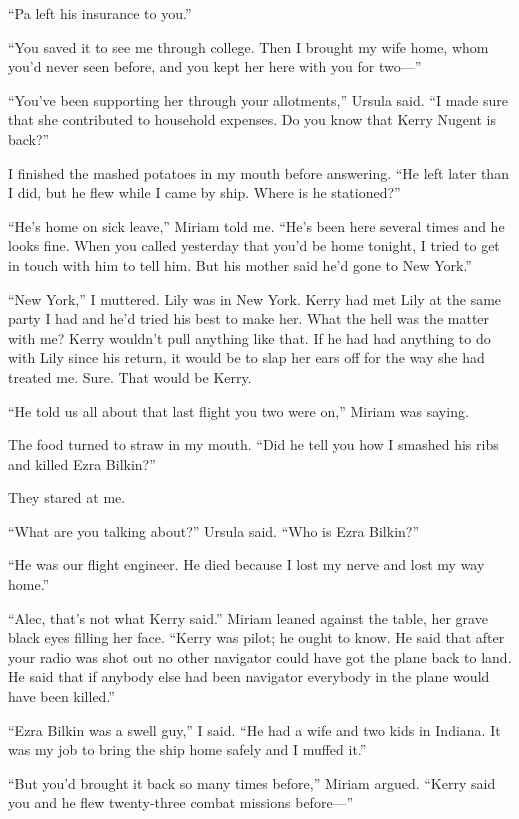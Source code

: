 \documentclass{novel}
\begin{document}
{“Pa left his insurance to you.”

“You saved it to see me through college. Then I brought my wife home, whom you’d never seen before, and you kept her here with you for two—”

“You’ve been supporting her through your allotments,” Ursula said. “I made sure that she contributed to household expenses. Do you know that Kerry Nugent is back?”

I finished the mashed potatoes in my mouth before answering. “He left later than I did, but he flew while I came by ship. Where is he stationed?”

“He’s home on sick leave,” Miriam told me. “He’s been here several times and he looks fine. When you called yesterday that you’d be home tonight, I tried to get in touch with him to tell him. But his mother said he’d gone to New York.”

“New York,” I muttered. Lily was in New York. Kerry had met Lily at the same party I had and he’d tried his best to make her. What the hell was the matter with me? Kerry wouldn’t pull anything like that. If he had had anything to do with Lily since his return, it would be to slap her ears off for the way she had treated me. Sure. That would be Kerry.

“He told us all about that last flight you two were on,” Miriam was saying.

The food turned to straw in my mouth. “Did he tell you how I smashed his ribs and killed Ezra Bilkin?”

They stared at me.

“What are you talking about?” Ursula said. “Who is Ezra Bilkin?”

“He was our flight engineer. He died because I lost my nerve and lost my way home.”

“Alec, that’s not what Kerry said.” Miriam leaned against the table, her grave black eyes filling her face. “Kerry was pilot; he ought to know. He said that after your radio was shot out no other navigator could have got the plane back to land. He said that if anybody else had been navigator everybody in the plane would have been killed.”

“Ezra Bilkin was a swell guy,” I said. “He had a wife and two kids in Indiana. It was my job to bring the ship home safely and I muffed it.”

“But you’d brought it back so many times before,” Miriam argued. “Kerry said you and he flew twenty-three combat missions before—”

}
\end{document}
